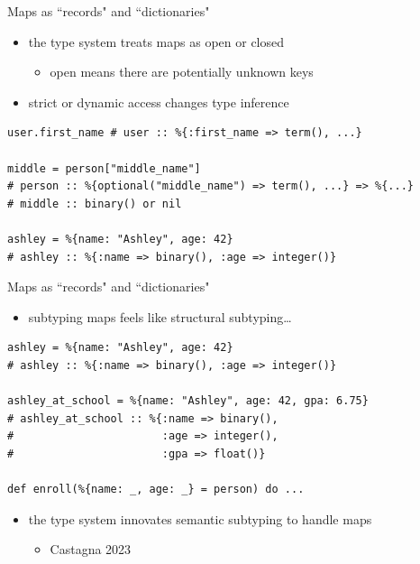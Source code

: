 \documentclass[
  ignorenonframetext,
  aspectratio=169]{beamer}
\providecommand{\tightlist}{%
  \setlength{\itemsep}{0pt}\setlength{\parskip}{0pt}}
\begin{document}
\begin{frame}[fragile]{Maps as ``records" and ``dictionaries"}
\label{maps-as-records-and-dictionaries-1}
\begin{itemize}
\tightlist
\item
  the type system treats maps as open or closed

  \begin{itemize}
  \tightlist
  \item
    open means there are potentially unknown keys
  \end{itemize}
\item
  strict or dynamic access changes type inference
\end{itemize}

\begin{lstlisting}
user.first_name # user :: %{:first_name => term(), ...}

middle = person["middle_name"]
# person :: %{optional("middle_name") => term(), ...} => %{...}
# middle :: binary() or nil

ashley = %{name: "Ashley", age: 42}
# ashley :: %{:name => binary(), :age => integer()}
\end{lstlisting}
\end{frame}

\begin{frame}[fragile]{Maps as ``records" and ``dictionaries"}
\label{maps-as-records-and-dictionaries-2}
\begin{itemize}
\tightlist
\item
  subtyping maps feels like structural subtyping\ldots{}
\end{itemize}

\begin{lstlisting}
ashley = %{name: "Ashley", age: 42}
# ashley :: %{:name => binary(), :age => integer()}

ashley_at_school = %{name: "Ashley", age: 42, gpa: 6.75}
# ashley_at_school :: %{:name => binary(),
#                       :age => integer(),
#                       :gpa => float()}

def enroll(%{name: _, age: _} = person) do ...
\end{lstlisting}

\begin{itemize}
\tightlist
\item
  the type system innovates semantic subtyping to handle maps

  \begin{itemize}
  \tightlist
  \item
    Castagna 2023
  \end{itemize}
\end{itemize}
\end{frame}
\end{document}
